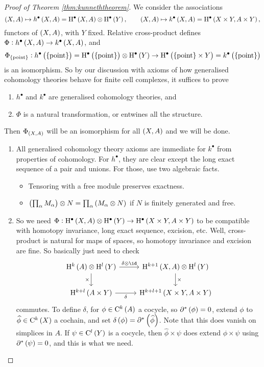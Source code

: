 \begin{proof}[Proof of Theorem \ref{thm:kunneththeorem}]
We consider the associations
$$ \br{X, A} \mapsto h^\bullet\br{X, A} = \H^\bullet\br{X, A} \otimes \H^\bullet\br{Y}, \qquad \br{X, A} \mapsto k^\bullet\br{X, A} = \H^\bullet\br{X \times Y, A \times Y}, $$
functors of $ \br{X, A} $, with $ Y $ fixed. Relative cross-product defines $ \Phi : h^\bullet\br{X, A} \to k^\bullet\br{X, A} $, and
$$ \Phi_{\pt} : h^\bullet\br{\pt} = \H^\bullet\br{\pt} \otimes \H^\bullet\br{Y} \to \H^\bullet\br{\pt \times Y} = k^\bullet\br{\pt} $$
is an isomorphism. So by our discussion with axioms of how generalised cohomology theories behave for finite cell complexes, it suffices to prove
\begin{enumerate}
\item $ h^\bullet $ and $ k^\bullet $ are generalised cohomology theories, and
\item $ \Phi $ is a natural transformation, or entwines all the structure.
\end{enumerate}
Then $ \Phi_{\br{X, A}} $ will be an isomorphism for all $ \br{X, A} $ and we will be done.
\begin{enumerate}
\item All generalised cohomology theory axioms are immediate for $ k^\bullet $ from properties of cohomology. For $ h^\bullet $, they are clear except the long exact sequence of a pair and unions. For those, use two algebraic facts.
\begin{itemize}
\item Tensoring with a free module preserves exactness.
\item $ \br{\prod_\alpha M_\alpha} \otimes N = \prod_\alpha \br{M_\alpha \otimes N} $ if $ N $ is finitely generated and free.
\end{itemize}
\item So we need $ \Phi : \H^\bullet\br{X, A} \otimes \H^\bullet\br{Y} \to \H^\bullet\br{X \times Y, A \times Y} $ to be compatible with homotopy invariance, long exact sequence, excision, etc. Well, cross-product is natural for maps of spaces, so homotopy invariance and excision are fine. So basically just need to check
$$
\begin{tikzcd}
\H^k\br{A} \otimes \H^l\br{Y} \arrow{r}{\delta \otimes \id} \arrow{d}[swap]{\times} & \H^{k + 1}\br{X, A} \otimes \H^l\br{Y} \arrow{d}{\times} \\
\H^{k + l}\br{A \times Y} \arrow{r}[swap]{\delta} & \H^{k + l + 1}\br{X \times Y, A \times Y}
\end{tikzcd}
$$
commutes. To define $ \delta $, for $ \phi \in \C^k\br{A} $ a cocycle, so $ \da^*\br{\phi} = 0 $, extend $ \phi $ to $ \widehat{\phi} \in \C^k\br{X} $ a cochain, and set $ \delta\br{\phi} = \da^*\br{\widehat{\phi}} $. Note that this does vanish on simplices in $ A $. If $ \psi \in \C^l\br{Y} $ is a cocycle, then $ \widehat{\phi} \times \psi $ does extend $ \phi \times \psi $ using $ \da^*\br{\psi} = 0 $, and this is what we need.
\end{enumerate}
\end{proof}

